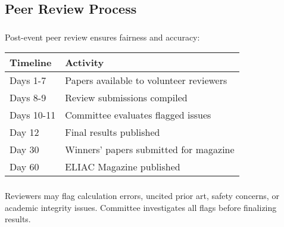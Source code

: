 \subsection{Peer Review Process}

\subsubsection{}
Post-event peer review ensures fairness and accuracy:

\begin{tabular}{ll}
\toprule
Timeline & Activity \\
\midrule
Days 1-7 & Papers available to volunteer reviewers \\
Days 8-9 & Review submissions compiled \\
Days 10-11 & Committee evaluates flagged issues \\
Day 12 & Final results published \\
Day 30 & Winners' papers submitted for magazine \\
Day 60 & ELIAC Magazine published \\
\bottomrule
\end{tabular}

\subsubsection{}
Reviewers may flag calculation errors, uncited prior art, safety concerns, or academic integrity issues. Committee investigates all flags before finalizing results.